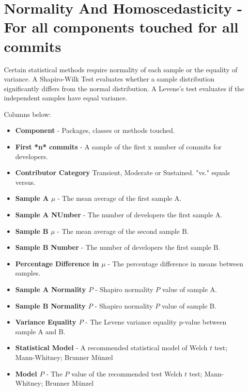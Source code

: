 \section{Normality And Homoscedasticity - For all components touched for all commits} 

Certain statistical methods require normality of each sample or the equality of variance. A Shapiro-Wilk Test evaluates whether a sample distribution significantly differs from the normal distribution. A Levene's test evaluates if the independent samples have equal variance.  

Columns below:  
\begin{itemize}
                    \item{\textbf{Component} - Packages, classes or methods touched.}
                    \item{\textbf{First *n* commits} - A sample of the first x number of commits for developers. }
                    \item{\textbf{Contributor Category} Transient, Moderate or Sustained. "vs." equals versus.}
                    \item{\textbf{Sample A $\mu$} - The mean average of the first sample A. }
                    \item{\textbf{Sample A NUmber} - The number of developers the first sample A.  }
                    \item{\textbf{Sample B $\mu$} - The mean average of the second sample B.}
                    \item{\textbf{Sample B Number} - The number of developers the first sample B.}
                    \item{\textbf{Percentage Difference in $\mu$} - The percentage difference in means between samples.}
                    \item{\textbf{Sample A Normality $P$} - Shapiro normality $P$ value of sample A. } 
                    \item{\textbf{Sample B Normality $P$} - Shapiro normality $P$ value of sample B. }
                    \item{\textbf{Variance Equality $P$} - The Levene variance equality p-value between sample A and B. }
                    \item{\textbf{Statistical Model} - A recommended statistical model of Welch $t$ test; Mann-Whitney; Brunner Münzel }
                    \item{\textbf{Model $P$} - The $P$ value of the recommended test Welch $t$ test; Mann-Whitney; Brunner Münzel }
                \end{itemize}
    


